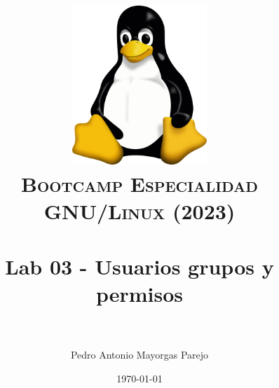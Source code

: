 

\graphicspath{ {img/} }

\title{
\normalfont \normalsize
\includegraphics[width=6cm,height=6cm]{logo}\\
\textsc{\textbf{Bootcamp Especialidad GNU/Linux (2023)}} \\ [25pt] %
\horrule{0.5pt} \\[0.4cm] %
\huge Lab 03 - Usuarios grupos y permisos \\ %
\horrule{2pt} \\[0.5cm] %
}



\author{Pedro Antonio Mayorgas Parejo} %

\date{\normalsize\today} %




\maketitle %

\newpage %

\tableofcontents %

\newpage


